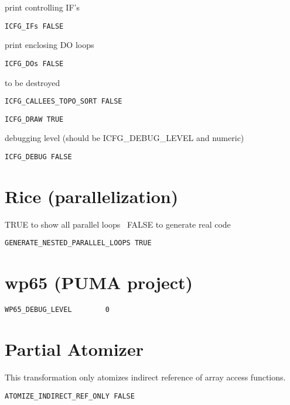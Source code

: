 print controlling IF's

\begin{verbatim}
ICFG_IFs FALSE
\end{verbatim}

print enclosing DO loops

\begin{verbatim}
ICFG_DOs FALSE
\end{verbatim}

to be destroyed

\begin{verbatim}
ICFG_CALLEES_TOPO_SORT FALSE
\end{verbatim}

\begin{verbatim}
ICFG_DRAW TRUE
\end{verbatim}

debugging level (should be ICFG_DEBUG_LEVEL and numeric)

\begin{verbatim}
ICFG_DEBUG FALSE
\end{verbatim}

\section{Rice (parallelization)}

TRUE to show all parallel loops  \
FALSE to generate real code

\begin{verbatim}
GENERATE_NESTED_PARALLEL_LOOPS TRUE
\end{verbatim}

\section{wp65 (PUMA project)}

\begin{verbatim}
WP65_DEBUG_LEVEL        0
\end{verbatim}

\section{Partial Atomizer}

This transformation only atomizes indirect reference of array access functions.


\begin{verbatim}
ATOMIZE_INDIRECT_REF_ONLY FALSE
\end{verbatim}

